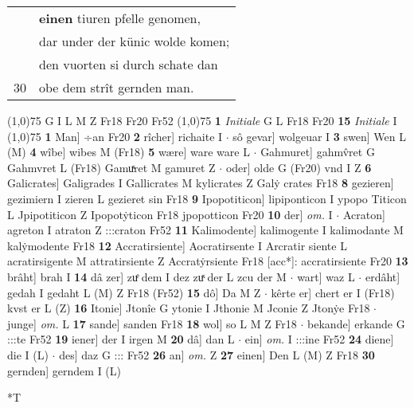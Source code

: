 \documentclass[8pt,a4paper,notitlepage]{article}
\begin{document}
\begin{table}[ht]
\begin{minipage}[t]{0.5\linewidth}
\begin{tabular}{rl}
 & \textbf{einen} tiuren pfelle genomen,\\ 
 & dar under der künic wolde komen;\\ 
 & den vuorten si durch schate dan\\ 
30 & obe dem strît gernden man.\\ 
\end{tabular}
\scriptsize
\line(1,0){75} \newline
G I L M Z Fr18 Fr20 Fr52 \newline
\line(1,0){75} \newline
\textbf{1} \textit{Initiale} G L Fr18 Fr20  \textbf{15} \textit{Initiale} I  \newline
\line(1,0){75} \newline
\textbf{1} Man] ÷an Fr20 \textbf{2} rîcher] richaite I  $\cdot$ sô gevar] wolgeuar I \textbf{3} swen] Wen L (M) \textbf{4} wîbe] wibes M (Fr18) \textbf{5} wære] ware ware L  $\cdot$ Gahmuret] gahmv̂ret G Gahmvret L (Fr18) Gamuͯret M gamuret Z  $\cdot$ oder] olde G (Fr20) vnd I Z \textbf{6} Galicrates] Galigrades I Gallicrates M kylicrates Z Galẏ crates Fr18 \textbf{8} gezieren] gezimiern I zieren L gezieret sin Fr18 \textbf{9} Ipopotiticon] lipiponticon I ypopo Titicon L Jpipotiticon Z Ipopotẏticon Fr18 jpopotticon Fr20 \textbf{10} der] \textit{om.} I  $\cdot$ Acraton] agreton I atraton Z :::craton Fr52 \textbf{11} Kalimodente] kalimogente I kalimodante M kalẏmodente Fr18 \textbf{12} Accratirsiente] Aocratirsente I Arcratir siente L acratirsigente M attratirsiente Z Accratẏrsiente Fr18 [acc*]: accratirsiente Fr20 \textbf{13} brâht] brah I \textbf{14} dâ zer] zuͤ dem I dez zuͯ der L zcu der M  $\cdot$ wart] waz L  $\cdot$ erdâht] gedah I gedaht L (M) Z Fr18 (Fr52) \textbf{15} dô] Da M Z  $\cdot$ kêrte er] chert er I (Fr18) kvst er L (Z) \textbf{16} Itonie] Jtonîe G ytonie I Jthonie M Jconie Z Jtonẏe Fr18  $\cdot$ junge] \textit{om.} L \textbf{17} sande] sanden Fr18 \textbf{18} wol] so L M Z Fr18  $\cdot$ bekande] erkande G :::te Fr52 \textbf{19} iener] der I irgen M \textbf{20} dâ] dan L  $\cdot$ ein] \textit{om.} I :::ine Fr52 \textbf{24} diene] die I (L)  $\cdot$ des] daz G ::: Fr52 \textbf{26} an] \textit{om.} Z \textbf{27} einen] Den L (M) Z Fr18 \textbf{30} gernden] gerndem I (L) \newline
\end{minipage}
\hspace{0.5cm}
\begin{minipage}[t]{0.5\linewidth}
\small
\begin{center}*T
\end{center}

\end{minipage}
\end{table}
\end{document}
